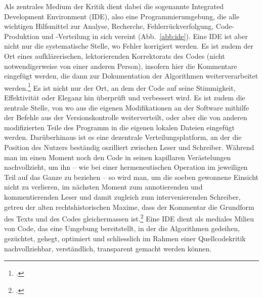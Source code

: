 \documentclass[a4paper,11pt]{article}
\begin{document}
Als zentrales Medium der Kritik dient dabei die sogenannte Integrated Development Environment (IDE), also eine Programmierumgebung, die alle wichtigen Hilfsmittel zur Analyse, Recherche, Fehlerrückverfolgung, Code-Produktion und -Verteilung in sich vereint (Abb.~\ref{abb:ide}). Eine IDE ist aber nicht nur die systematische Stelle, wo Fehler korrigiert werden. Es ist zudem der Ort eines aufklärerischen, lektorierenden Korrektorats des Codes (nicht notwendigerweise von einer anderen Person), insofern hier die Kommentare eingefügt werden, die dann zur Dokumentation der Algorithmen weiterverarbeitet werden.\footcite[Dieses Prinzip, wie es etwa mit Javadoc umgesetzt worden ist, geht auf das Paradigma des \emph{Literate Programming} von][zurück.]{knuth:1984} Es ist nicht nur der Ort, an dem der Code auf seine Stimmigkeit, Effektivität oder Eleganz hin überprüft und verbessert wird. Es ist zudem die zentrale Stelle, von wo aus die eigenen Modifikationen an der Software mithilfe der Befehle aus der Versionskontrolle weiterverteilt, oder aber die von anderen modifizierten Teile des Programm in die eigenen lokalen Dateien eingefügt werden. Darüberhinaus ist es eine dezentrale Verteilungsplatform, an der die Position des Nutzers beständig oszilliert zwischen Leser und Schreiber. Während man im einen Moment noch den Code in seinen kapillaren Verästelungen nachvollzieht, um ihn – wie bei einer hermeneutischen Operation im jeweiligen Teil auf das Ganze zu beziehen – so wird man, um die soeben gewonnene Einsicht nicht zu verlieren, im nächsten Moment zum annotierenden und kommentierenden Leser und damit zugleich zum intervenierenden Schreiber, getreu der alten rechtshistorischen Maxime, dass der Kommentar die Grundform des Texts und des Codes gleichermassen ist.\footcite[Vgl.][]{krajewski+vismann:2009} Eine IDE dient als mediales Milieu von Code, das eine Umgebung bereitstellt, in der die Algorithmen gedeihen, gezüchtet, gehegt, optimiert und schliesslich im Rahmen einer Quellcodekritik nachvollziehbar, verständlich, transparent gemacht werden können.
\end{document}
